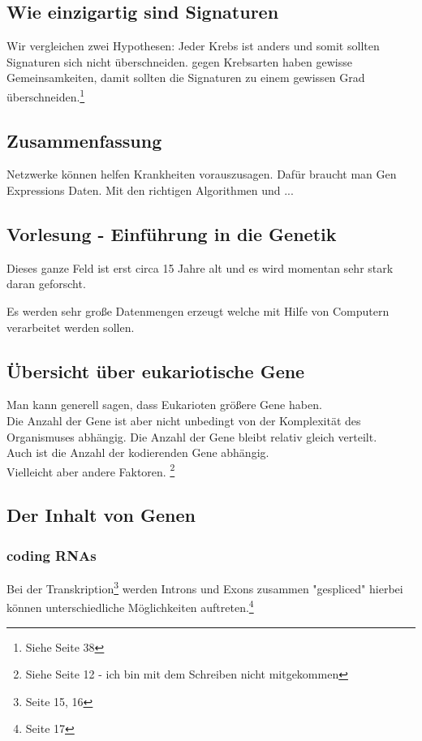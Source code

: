 \documentclass{article}
\begin{document}
\subsection{Wie einzigartig sind Signaturen}
Wir vergleichen zwei Hypothesen: Jeder Krebs ist anders und somit sollten Signaturen sich nicht überschneiden. gegen Krebsarten haben gewisse Gemeinsamkeiten, damit sollten die Signaturen zu einem gewissen Grad überschneiden.\footnote{Siehe Seite 38}
\subsection{Zusammenfassung}
Netzwerke können helfen Krankheiten vorauszusagen. Dafür braucht man Gen Expressions Daten. Mit den richtigen Algorithmen und ... 

\subsection{Vorlesung - Einführung in die Genetik}

Dieses ganze Feld ist erst circa 15 Jahre alt und es wird momentan sehr stark daran geforscht.

Es werden sehr große Datenmengen erzeugt welche mit Hilfe von Computern verarbeitet werden
sollen.

\subsection{Übersicht über eukariotische Gene}
Man kann generell sagen, dass Eukarioten größere Gene haben.
\\
Die Anzahl der Gene ist aber nicht unbedingt von der Komplexität des Organismuses abhängig.
Die Anzahl der Gene bleibt relativ gleich verteilt. 
\\
Auch ist die Anzahl der kodierenden Gene abhängig.
\\
Vielleicht aber andere Faktoren. \footnote{Siehe Seite 12 - ich bin mit dem Schreiben nicht mitgekommen}

\subsection{Der Inhalt von Genen}
\subsubsection{coding RNAs}
Bei der Transkription\footnote{Seite 15, 16} werden Introns und Exons zusammen "gespliced" hierbei
können unterschiedliche Möglichkeiten auftreten.\footnote{Seite 17}\\
\end{document}
